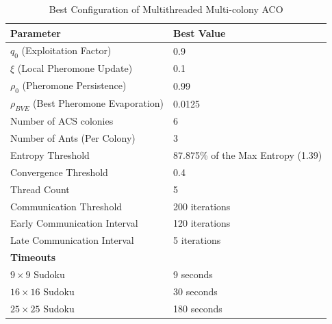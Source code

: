         \begin{table}[H]
                \caption{Best Configuration of Multithreaded Multi-colony ACO}
                \centering
                \renewcommand{\arraystretch}{1.2} 
                \setlength{\tabcolsep}{10pt} 
                \begin{tabular}{|l|l|}
                \hline
                \textbf{Parameter}                          & \textbf{Best Value}                               \\ \hline
                $q_0$ (Exploitation Factor)                 & 0.9                                        \\ \hline
                $\xi$ (Local Pheromone Update)              & 0.1                                         \\ \hline
                $\rho_0$ (Pheromone Persistence)            & 0.99                                        \\ \hline
                $\rho_{BVE}$ (Best Pheromone Evaporation)   & 0.0125                                                                            \\ \hline
                Number of ACS colonies                      & 6                                          \\ \hline
                Number of Ants (Per Colony)                 & 3                                           \\ \hline
                Entropy Threshold                           & 87.875\% of the Max Entropy (1.39)                              \\ \hline
                Convergence Threshold                     & 0.4                                                      \\ \hline
                Thread Count                                & 5                                         \\ \hline
                Communication Threshold                     & 200 iterations                             \\ \hline
                Early Communication Interval                & 120 iterations                           \\ \hline
                Late Communication Interval                 & 5 iterations                              \\ \hline
                \textbf{Timeouts}                           &                                                       \\ \hline
                $9 \times 9$ Sudoku                         & 9 seconds                                             \\ \hline
                $16 \times 16$ Sudoku                       & 30 seconds                                            \\ \hline
                $25 \times 25$ Sudoku                       & 180 seconds \\ \hline
                \end{tabular}
                \label{tab:best_parameters}
                \end{table}
